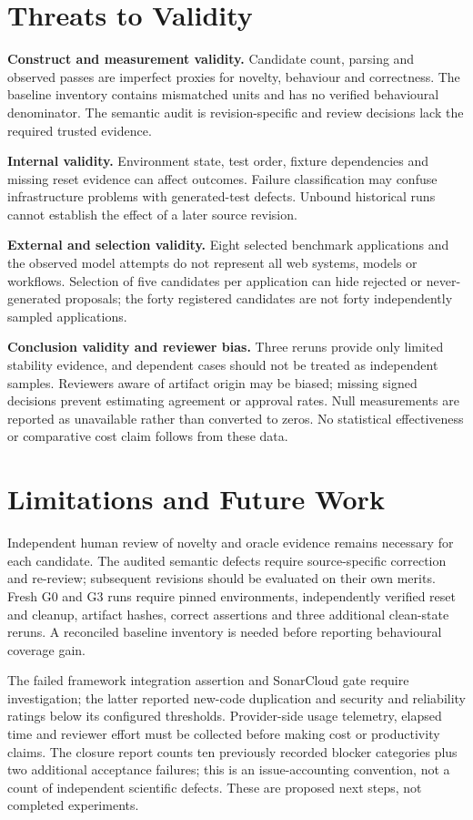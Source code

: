 \documentclass[pdflatex,sn-mathphys-num]{sn-jnl}
\begin{document}
\section{Threats to Validity}\label{sec:threats}
\textbf{Construct and measurement validity.} Candidate count, parsing and observed passes are imperfect proxies for novelty, behaviour and correctness. The baseline inventory contains mismatched units and has no verified behavioural denominator. The semantic audit is revision-specific and review decisions lack the required trusted evidence.

\textbf{Internal validity.} Environment state, test order, fixture dependencies and missing reset evidence can affect outcomes. Failure classification may confuse infrastructure problems with generated-test defects. Unbound historical runs cannot establish the effect of a later source revision.

\textbf{External and selection validity.} Eight selected benchmark applications and the observed model attempts do not represent all web systems, models or workflows. Selection of five candidates per application can hide rejected or never-generated proposals; the forty registered candidates are not forty independently sampled applications.

\textbf{Conclusion validity and reviewer bias.} Three reruns provide only limited stability evidence, and dependent cases should not be treated as independent samples. Reviewers aware of artifact origin may be biased; missing signed decisions prevent estimating agreement or approval rates. Null measurements are reported as unavailable rather than converted to zeros. No statistical effectiveness or comparative cost claim follows from these data.

\section{Limitations and Future Work}\label{sec:future}
Independent human review of novelty and oracle evidence remains necessary for each candidate. The audited semantic defects require source-specific correction and re-review; subsequent revisions should be evaluated on their own merits. Fresh G0 and G3 runs require pinned environments, independently verified reset and cleanup, artifact hashes, correct assertions and three additional clean-state reruns. A reconciled baseline inventory is needed before reporting behavioural coverage gain.

The failed framework integration assertion and SonarCloud gate require investigation; the latter reported new-code duplication and security and reliability ratings below its configured thresholds. Provider-side usage telemetry, elapsed time and reviewer effort must be collected before making cost or productivity claims. The closure report counts ten previously recorded blocker categories plus two additional acceptance failures; this is an issue-accounting convention, not a count of independent scientific defects. These are proposed next steps, not completed experiments.
\end{document}
